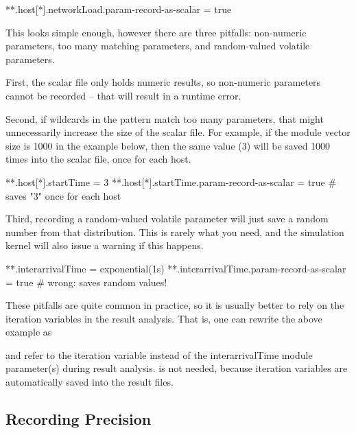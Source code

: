 \begin{inifile}
**.host[*].networkLoad.param-record-as-scalar = true
\end{inifile}

This looks simple enough, however there are three pitfalls:
non-numeric parameters, too many matching parameters, and
random-valued volatile parameters.

First, the scalar file only holds numeric results, so non-numeric
parameters cannot be recorded -- that will result in a runtime
error.

Second, if wildcards in the pattern match too many parameters, that
might unnecessarily increase the size of the scalar file. For example,
if the  module vector size is 1000 in the example below, then the
same value (3) will be saved 1000 times into the scalar file, once for
each host.

\begin{inifile}
**.host[*].startTime = 3
**.host[*].startTime.param-record-as-scalar = true  # saves "3" once for each host
\end{inifile}

Third, recording a random-valued volatile parameter will just save a
random number from that distribution. This is rarely what you need, and
the simulation kernel will also issue a warning if this happens.

\begin{inifile}
**.interarrivalTime = exponential(1s)
**.interarrivalTime.param-record-as-scalar = true  # wrong: saves random values!
\end{inifile}

These pitfalls are quite common in practice, so it is usually better
to rely on the iteration variables in the result analysis.
That is, one can rewrite the above example as


and refer to the  iteration variable instead of the
interarrivalTime module parameter(s) during result analysis.
 is not needed, because iteration variables are
automatically saved into the result files.


\subsection{Recording Precision}
\label{sec:outputfile-precision}

